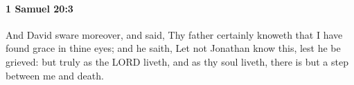 
		\paragraph{1 Samuel 20:3} %
			\label{1SAMUEL-20-3}

			And David sware moreover, and said, Thy father certainly knoweth that I have found grace in thine eyes; and he saith, Let not Jonathan know this, lest he be grieved: but truly as the LORD liveth, and as thy soul liveth, there is but a step between me and death.


